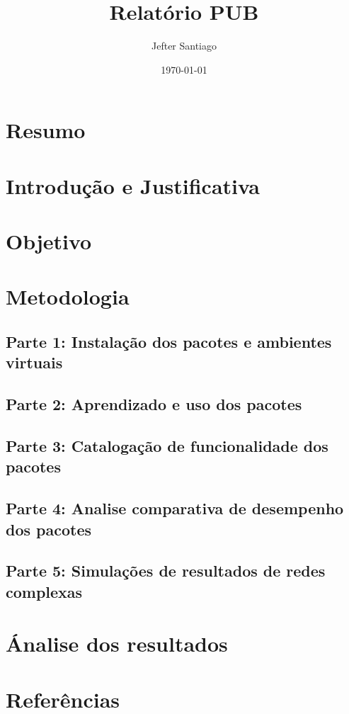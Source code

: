 \documentclass[11pt]{article}
\author{Jefter Santiago}
\date{\today}
\title{Relatório PUB}
\begin{document}
\maketitle
\tableofcontents

\section{Resumo}
\label{sec:orgbd7c6e7}
\section{Introdução e Justificativa}
\label{sec:org6671feb}
\section{Objetivo}
\label{sec:org984dddd}
\section{Metodologia}
\label{sec:org014a2f8}
\subsection{Parte 1: Instalação dos pacotes e ambientes virtuais}
\label{sec:org14b1108}
\subsection{Parte 2: Aprendizado e uso dos pacotes}
\label{sec:orga7115d7}
\subsection{Parte 3: Catalogação de funcionalidade dos pacotes}
\label{sec:org554c78a}
\subsection{Parte 4: Analise comparativa de desempenho dos pacotes}
\label{sec:org225f913}
\subsection{Parte 5: Simulações de resultados de redes complexas}
\label{sec:org2032471}
\section{Ánalise dos resultados}
\label{sec:orgf67e240}
\section{Referências}
\label{sec:org1304eb2}
\end{document}

